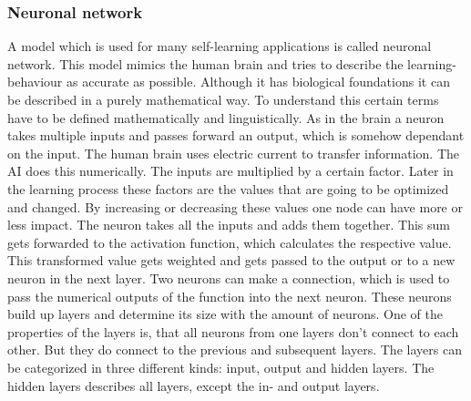 \documentclass[12pt]{article}
\begin{document}
\subsubsection{Neuronal network}\label{sec:nnmath}
A model which is used for many self-learning applications is called \gls{neuronal network}. 
This model mimics the human brain and tries to describe the learning-behaviour as accurate as possible. Although it has biological foundations it can be described in a purely mathematical way. To understand this certain terms have to be defined mathematically and linguistically.
As in the brain a \gls{neuron} takes multiple  \glspl{input} and passes forward an output, which is somehow dependant on the  \gls{input}. The human brain uses electric current to transfer information. The \gls{AI} does this numerically. The \glspl{input} are multiplied by a certain factor. Later in the learning process these factors are the values that are going to be optimized and changed. By increasing or decreasing these values one node can have more or less impact. The \gls{neuron} takes all the \glspl{input} and adds them together. This sum gets forwarded to the \gls{activation function}, which calculates the respective value. This transformed value gets weighted and gets passed to the output or to a new \gls{neuron} in the next \gls{layer}. Two \glspl{neuron} can make a connection, which is used to pass the numerical \glspl{output} of the function into the next neuron. These \glspl{neuron} build up \glspl{layer} and determine its size with the amount of \glspl{neuron}. One of the properties of the   \glspl{layer} is, that all \glspl{neuron} from one  \glspl{layer} don't connect to each other. But they do connect to the previous and subsequent  \glspl{layer}. The \glspl{layer} can be categorized in three different kinds:  \gls{input}, output and \glspl{hidden layer}. The hidden \glspl{layer} describes all layers, except the in- and  \glspl{output layer}. \cite{neuronal_network}\\
\end{document}
